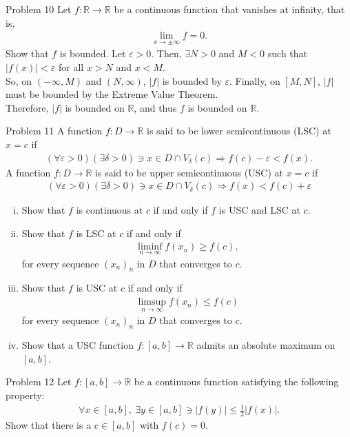 \documentclass[10pt]{extarticle}
\newcommand{\R}{\mathbb{R}}
\begin{document}
  \begin{problem}{Problem 10}
    Let $f: \R\rightarrow \R$ be a continuous function that vanishes at infinity, that is,
    \begin{align*}
      \lim_{x\rightarrow \pm\infty}f = 0.
    \end{align*}
    Show that $f$ is bounded.
    \tcblower
    Let $\varepsilon > 0$. Then, $\exists N > 0$ and $M < 0$ such that $|f(x)| < \varepsilon$ for all $x > N$ and $x < M$.\\

    So, on $(-\infty,M)$ and $(N,\infty)$, $|f|$ is bounded by $\varepsilon$. Finally, on $[M,N]$, $|f|$ must be bounded by the Extreme Value Theorem.\\

    Therefore, $|f|$ is bounded on $\R$, and thus $f$ is bounded on $\R$.
  \end{problem}
  \begin{problem}{Problem 11}
    A function $f: D\rightarrow \R$ is said to be lower semicontinuous (LSC) at $x=c$ if
    \begin{align*}
      (\forall \varepsilon > 0)(\exists \delta > 0) \ni x\in D\cap V_{\delta}(c) \Rightarrow f(c) - \varepsilon < f(x).
    \end{align*}
    A function $f: D\rightarrow \R$ is said to be upper semicontinuous (USC) at $x=c$ if
    \begin{align*}
      (\forall \varepsilon > 0)(\exists \delta > 0) \ni x\in D\cap V_{\delta}(c) \Rightarrow f(x) < f(c) + \varepsilon
    \end{align*}
    \begin{enumerate}[(i)]
      \item Show that $f$ is continuous at $c$ if and only if $f$ is USC and LSC at $c$.
      \item Show that $f$ is LSC at $c$ if and only if
        \begin{align*}
          \liminf_{n\rightarrow\infty}f(x_n) \geq f(c),
        \end{align*}
        for every sequence $(x_n)_n$ in $D$ that converges to $c$.
      \item Show that $f$ is USC at $c$ if and only if
        \begin{align*}
          \limsup_{n\rightarrow\infty}f(x_n) \leq f(c)
        \end{align*}
        for every sequence $(x_n)_n$ in $D$ that converges to $c$.
      \item Show that a USC function $f: [a,b]\rightarrow \R$ admits an absolute maximum on $[a,b]$.
    \end{enumerate}
  \end{problem}
  \begin{problem}{Problem 12}
    Let $f: [a,b] \rightarrow \R$ be a continuous function satisfying the following property:
    \begin{align*}
      \forall x\in [a,b],~\exists y\in[a,b] \ni |f(y)| \leq \frac{1}{2}|f(x)|.
    \end{align*}
    Show that there is a $c\in [a,b]$ with $f(c) = 0$.
  \end{problem}
\end{document}
